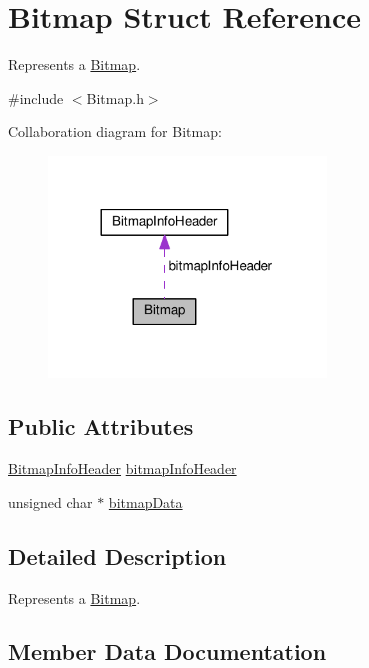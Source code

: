 \hypertarget{structBitmap}{}\section{Bitmap Struct Reference}
\label{structBitmap}


Represents a \hyperlink{structBitmap}{Bitmap}.  




{\ttfamily \#include $<$Bitmap.\+h$>$}



Collaboration diagram for Bitmap\+:
\nopagebreak
\begin{figure}[H]
\begin{center}
\leavevmode
\includegraphics[width=209pt]{structBitmap__coll__graph}
\end{center}
\end{figure}
\subsection*{Public Attributes}
\begin{DoxyCompactItemize}
\item 
\hyperlink{structBitmapInfoHeader}{Bitmap\+Info\+Header} \hyperlink{structBitmap_a95c481a5ce1ff4af08cd135ca4af120b}{bitmap\+Info\+Header}
\item 
unsigned char $\ast$ \hyperlink{structBitmap_a581eac36ec50d730299b6df60e644750}{bitmap\+Data}
\end{DoxyCompactItemize}


\subsection{Detailed Description}
Represents a \hyperlink{structBitmap}{Bitmap}. 

\subsection{Member Data Documentation}
